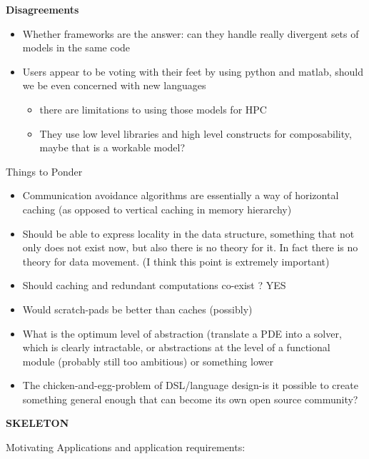 \noindent
\textbf{Disagreements}
\begin{itemize}
  \item Whether frameworks are the answer: can they handle really divergent sets of models in the same code
  \item Users appear to be voting with their feet by using python and matlab, should we be even concerned with new languages
    \begin{itemize}
      \item there are limitations to using those models for HPC
      \item They use low level libraries and high level constructs for composability, maybe that is a workable model?
    \end{itemize}
\end{itemize}

\noindent
Things to Ponder
\begin{itemize}
  \item Communication avoidance algorithms are essentially a way of horizontal caching (as opposed to vertical caching in memory
  hierarchy)
  \item Should be able to express locality in the data structure, something that not only does not exist now, but also there is no theory for
  it.
    In fact there is no theory for data movement. (I think this point is extremely important)
  \item Should caching and redundant computations co-exist ? YES
  \item Would scratch-pads be better than caches (possibly)
  \item What is the optimum level of abstraction (translate a PDE into a solver, which is clearly intractable, or abstractions at the level
   of a functional module (probably still too ambitious) or something lower
  \item The chicken-and-egg-problem of DSL/language design-is it possible to create something general enough that can become its own open source
   community?
\end{itemize}

$ $\\
\noindent
{\large\textbf{SKELETON}}

Motivating Applications and application requirements:

